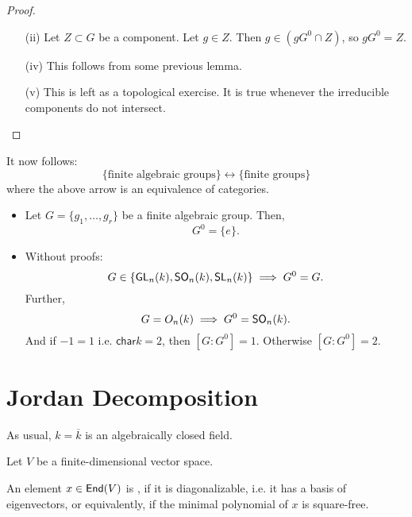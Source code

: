 \begin{proof}
\begin{enumerate}
	\textbf{Why is $G^0$ a normal?} If $g \in G$, then $gG^0g\i$ is a component that contains $e$, therefore $G^0 = gG^0g\i$.
	
	
	(Alternative proof that $m(G^0 \times G^0) = G^0$: Consider
	\begin{itemize}
		\item any continuous image of an irreducible set is irreducible.
	\item	the closure of any irreducible set is irreducible.
	\end{itemize}
	Ergo $\overline{m(G^0\times G^0)}$ is a closed irreducible set containing $e$. Ergo, $\overline{m(G^0\times G^0)} = G^0$).
	
	\item[(ii)] Let $Z \subset G$ be a component. Let $g \in Z$. Then $g \in (gG^0 \cap Z) $, so $gG^0 = Z$.
	\item[(iv)] This follows from some previous lemma.
	\item[(v)] This is left as a topological exercise. It is true whenever the irreducible components do not intersect.
	\end{enumerate}
\end{proof}

It now follows:
\[ \{ \text{finite algebraic groups}\} \longleftrightarrow \{ \text{finite groups} \} \]
where the above arrow is an equivalence of categories.

\begin{example}
	\begin{itemize}
		\item Let $G = \{g_1, \ldots, g_r\}$ be a finite algebraic group. Then,
		\[ G^0 = \{e\}.\]
		\item Without proofs:
		\[ G \in \{\textsf{GL}_n(k), \textsf{SO}_n(k),\textsf{SL}_n(k)\} \implies G^0 = G. \]
		Further,
		\[G = O_n(k) \implies G^0 = \textsf{SO}_n(k).\]
		And  if $-1 = 1$ i.e. $\textsf{char} k = 2$, then $[G:G^0] = 1$. Otherwise $[G:G^0] = 2$.
	\end{itemize}
\end{example}

\newpage
\section{Jordan Decomposition}
As usual, $k = \overline{k}$ is an algebraically closed field.
\begin{definition}
	Let $V$ be a finite-dimensional vector space.
	
	An element $x \in \textsf{End}(V)$ is , if it is diagonalizable, i.e. it has a basis of eigenvectors, or equivalently, if the minimal polynomial of $x$ is square-free.
\end{definition}
	
